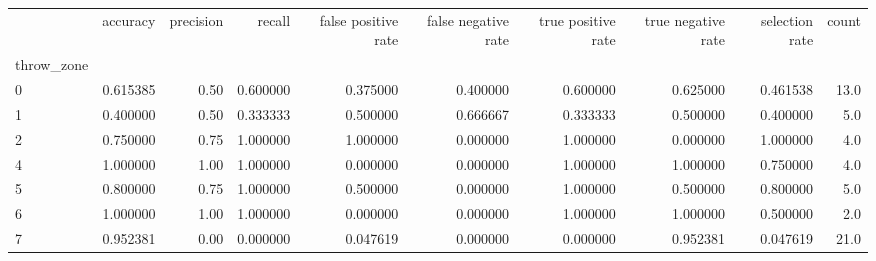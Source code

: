 \begin{tabular}{lrrrrrrrrr}
\toprule
{} &  accuracy &  precision &    recall &  false positive rate &  false negative rate &  true positive rate &  true negative rate &  selection rate &  count \\
throw\_zone &           &            &           &                      &                      &                     &                     &                 &        \\
\midrule
0          &  0.615385 &       0.50 &  0.600000 &             0.375000 &             0.400000 &            0.600000 &            0.625000 &        0.461538 &   13.0 \\
1          &  0.400000 &       0.50 &  0.333333 &             0.500000 &             0.666667 &            0.333333 &            0.500000 &        0.400000 &    5.0 \\
2          &  0.750000 &       0.75 &  1.000000 &             1.000000 &             0.000000 &            1.000000 &            0.000000 &        1.000000 &    4.0 \\
4          &  1.000000 &       1.00 &  1.000000 &             0.000000 &             0.000000 &            1.000000 &            1.000000 &        0.750000 &    4.0 \\
5          &  0.800000 &       0.75 &  1.000000 &             0.500000 &             0.000000 &            1.000000 &            0.500000 &        0.800000 &    5.0 \\
6          &  1.000000 &       1.00 &  1.000000 &             0.000000 &             0.000000 &            1.000000 &            1.000000 &        0.500000 &    2.0 \\
7          &  0.952381 &       0.00 &  0.000000 &             0.047619 &             0.000000 &            0.000000 &            0.952381 &        0.047619 &   21.0 \\
\bottomrule
\end{tabular}
